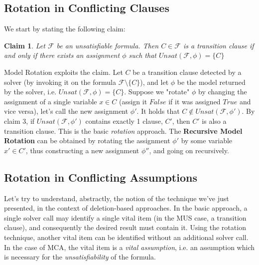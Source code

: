 \documentclass[]{article}
\newtheorem{claim}  {Claim}
\begin{document}
	\subsection{Rotation in Conflicting Clauses}
	We start by stating the following claim:
	\begin{claim}
		Let $ \mathcal{F} $ be an unsatisfiable formula. Then $ C \in \mathcal{F} $ is a transition clause if and only if there exists an assignment $ \phi $ such that $ Unsat(\mathcal{F}, \phi) = \{C\} $
	\end{claim}
	
	Model Rotation exploits the claim. Let $ C $ be a transition clause detected by a solver (by invoking it on the formula $ \mathcal{F} \setminus \{C\} $), and let $ \phi $ be the model returned by the solver, i.e. $ Unsat(\mathcal{F}, \phi) = \{C\} $. Suppose we "rotate" $ \phi $ by changing the assignment of a single variable $ x \in C $ (assign it $ False $ if it was assigned $ True $ and vice versa), let's call the new assignment $ \phi' $. It holds that $ C \notin  Unsat(\mathcal{F}, \phi') $. By claim 3, if $ Unsat(\mathcal{F}, \phi') $ contains exactly 1 clause, $ C' $, then $ C' $ is also a transition clause. This is the basic \textit{rotation} approach. The \textbf{Recursive Model Rotation} \cite{Rotation} can be obtained by rotating the assignment $ \phi' $ by some variable $ x' \in C' $, thus constructing a new assignment $ \phi'' $, and going on recursively.
	
	\subsection{Rotation in Conflicting Assumptions}
	Let's try to understand, abstractly, the notion of the technique we've just presented, in the context of deletion-based approaches. In the basic approach, a single solver call may identify a single vital item (in the MUS case, a transition clause), and consequently the desired result must contain it. Using the rotation technique, another vital item can be identified without an additional solver call. In the case of MCA, the vital item is a \textit{vital assumption}, i.e. an assumption which is necessary for the \textit{unsatisfiability} of the formula.\\
	
\end{document}
